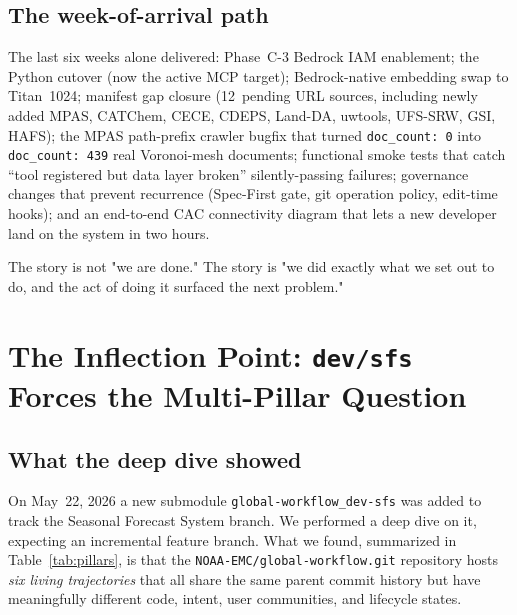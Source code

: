 \documentclass[11pt,letterpaper]{article}
\begin{document}
\subsection{The week-of-arrival path}

The last six weeks alone delivered: Phase~C-3 Bedrock IAM enablement;
the Python cutover (now the active MCP target); Bedrock-native
embedding swap to Titan~1024; manifest gap closure (12~pending URL
sources, including newly added MPAS, CATChem, CECE, CDEPS, Land-DA,
uwtools, UFS-SRW, GSI, HAFS); the MPAS path-prefix crawler bugfix
that turned \texttt{doc\_count: 0} into \texttt{doc\_count: 439}
real Voronoi-mesh documents; functional smoke tests that catch
``tool registered but data layer broken'' silently-passing failures;
governance changes that prevent recurrence (Spec-First gate, git
operation policy, edit-time hooks); and an end-to-end CAC connectivity
diagram that lets a new developer land on the system in two hours.

The story is not "we are done." The story is "we did exactly what we
set out to do, and the act of doing it surfaced the next problem."

\section{The Inflection Point: \texttt{dev/sfs} Forces the Multi-Pillar Question}

\subsection{What the deep dive showed}

On May~22, 2026 a new submodule \texttt{global-workflow\_dev-sfs} was
added to track the Seasonal Forecast System branch. We performed a
deep dive on it, expecting an incremental feature branch.
What we found, summarized in Table~\ref{tab:pillars}, is that the
\texttt{NOAA-EMC/global-workflow.git} repository hosts \emph{six
living trajectories} that all share the same parent commit history
but have meaningfully different code, intent, user communities, and
lifecycle states.
\end{document}
